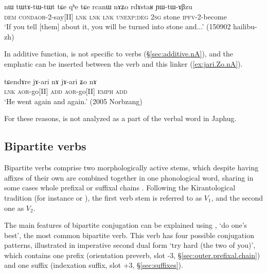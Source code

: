 \begin{exe}
\ex \label{ex:tWtAtWtWt.tCe}
\gll nɯ tɯ\redp{}tɤ-tɯ-tɯt tɕe qʰe tɕe rcanɯ nɤʑo rdɤstaʁ ɲɯ-tɯ-ɤβzu \\
\textsc{dem} \textsc{cond}\redp{}\textsc{aor}-2-say[II] \textsc{lnk} \textsc{lnk} \textsc{lnk} \textsc{unexp}:\textsc{deg} \textsc{2sg} stone \textsc{ipfv}-2-become \\
\glt `If you tell [them] about it, you will be turned into stone and...' (150902 hailibu-zh)
\end{exe}

In additive function,  is not specific to verbs (§\ref{sec:additive.nA}), and the emphatic  can be inserted between the verb and this linker (\ref{ex:jari.Zo.nA}).

\begin{exe}
\ex \label{ex:jari.Zo.nA}
\gll tɕendɤre jɤ-ari nɤ jɤ-ari ʑo nɤ \\
\textsc{lnk} \textsc{aor}-go[II] \textsc{add} \textsc{aor}-go[II] \textsc{emph} \textsc{add} \\
\glt `He went again and again.' (2005 Norbzang)
\end{exe}

For these reasons,  is not analyzed as a part of the verbal word in Japhug.

\subsection{Bipartite verbs} \label{sec:bipartite}
Bipartite verbs comprise two morphologically active stems, which despite having affixes of their own are combined together in one phonological word, sharing in some cases whole prefixal or suffixal chains \citep{jacques18bipartite}. Following the Kirantological tradition (for instance \citealt{doornenbal09} or \citealt{schackow15yakkha}), the first verb stem is referred to as $V_1$, and the second one as $V_2$.

The main features of bipartite conjugation can be explained using  , `do one's best', the most common bipartite verb. This verb has four possible conjugation patterns, illustrated in  imperative second dual form `try hard (the two of you)', which contains one prefix (orientation preverb, slot -3, §\ref{sec:outer.prefixal.chain}) and one suffix (indexation suffix, slot +3, §\ref{sec:suffixes}).
 
